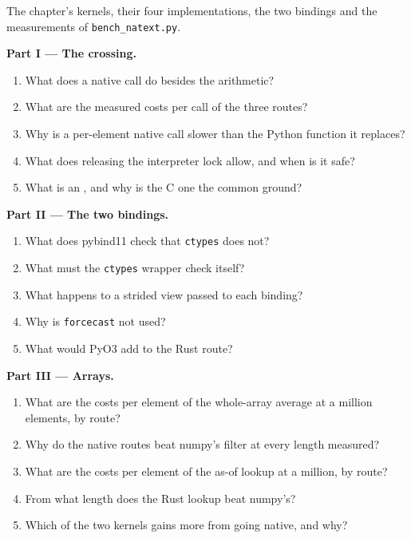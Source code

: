 \begin{problem}\label{pb:pl:native-extensions:1}
The chapter's kernels, their four implementations, the two bindings and the measurements of \texttt{bench\_natext.py}.

\medskip\noindent\textbf{Part I --- The crossing.}
\begin{enumerate}
\item What does a native call do besides the arithmetic?
\item What are the measured costs per call of the three routes?
\item Why is a per-element native call slower than the Python function it replaces?
\item What does releasing the interpreter lock allow, and when is it safe?
\item What is an , and why is the C one the common ground?
\end{enumerate}

\medskip\noindent\textbf{Part II --- The two bindings.}
\begin{enumerate}[resume]
\item What does pybind11 check that \texttt{ctypes} does not?
\item What must the \texttt{ctypes} wrapper check itself?
\item What happens to a strided view passed to each binding?
\item Why is \texttt{forcecast} not used?
\item What would PyO3 add to the Rust route?
\end{enumerate}

\medskip\noindent\textbf{Part III --- Arrays.}
\begin{enumerate}[resume]
\item What are the costs per element of the whole-array average at a million elements, by route?
\item Why do the native routes beat numpy's filter at every length measured?
\item What are the costs per element of the as-of lookup at a million, by route?
\item From what length does the Rust lookup beat numpy's?
\item Which of the two kernels gains more from going native, and why?
\end{enumerate}


\end{problem}
